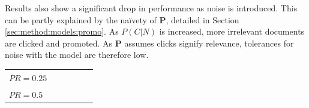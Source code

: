 Results also show a significant drop in performance as noise is introduced. This can be partly explained by the na\"{i}vety of \textbf{P}, detailed in Section \ref{sec:method:models:promo}. As $P(C|N)$ is increased, more irrelevant documents are clicked and promoted. As \textbf{P} assumes clicks signify relevance, tolerances for noise with the model are therefore low.

\begin{table}[t!]
	\renewcommand{\arraystretch}{1.3}
	\begin{center}
		\begin{small}
			\begin{tabularx}{\linewidth}{W{1.29cm}|W{1.29cm}|W{1.29cm}|W{1.29cm}|W{1.29cm}W{0.00000001cm}}
				
			 	&  &  &  & &
				\tabularnewline[1.4em]
				\hline
				
				& 
				& 
				& 
				& &
				\tabularnewline[1.4em]
				
				& 
				& 
				& 
				& &
				\tabularnewline[1.4em]
				\hline
				
				& 
				& 
				& 
				& &
				\tabularnewline[1.4em]
				

\end{tabularx}
\end{small}
\end{center}
\end{table}
